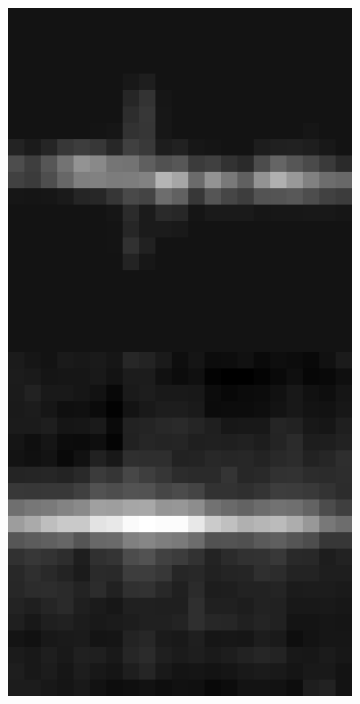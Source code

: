 \documentclass[10pt, letter]{article}
\begin{document}
\begin{figure}[h!]
\begin{subfigure}[t]{0.18\textwidth}
					\includegraphics[width=\textwidth]{figures/inv4}
				\end{subfigure}	
				~
				\begin{subfigure}[t]{0.18\textwidth}
					\centering

\end{subfigure}
\end{figure}
\end{document}
